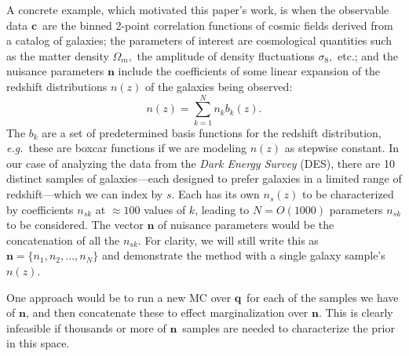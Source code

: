\documentclass[onecolumn,resetfootnote]{aastex7}
\newcommand{\eg}{\textit{e.g.}}
\newcommand{\vecc}{\ensuremath{\mathbf{c}}}
\newcommand{\vecq}{\ensuremath{\mathbf{q}}}
\newcommand{\vecn}{\ensuremath{\mathbf{n}}}
\begin{document}
A concrete example, which motivated this paper's work,
is when the observable data \vecc\ are the binned 2-point correlation functions of
cosmic fields derived from a catalog of galaxies; the parameters of
interest are cosmological quantities such as the  matter density
$\Omega_m,$ the amplitude of density fluctuations $\sigma_8,$
etc.; and the nuisance parameters $\vecn$
include the coefficients of some linear expansion of the redshift distributions $n(z)$ of the galaxies being observed:
\begin{equation}
  n(z) = \sum_{k=1}^{N} n_k b_k(z).
  \label{eq:nzbasis}
\end{equation}
The $b_k$ are a set of predetermined basis functions for the redshift
distribution, \eg\ these are boxcar functions if we are modeling $n(z)$ as
  stepwise constant.  In our case of analyzing the data from the  \textit{Dark Energy Survey} (DES), there are 10 distinct samples of galaxies---each designed to prefer galaxies in a limited range of redshift---which we can index by $s.$ Each has its own $n_s(z)$ to be characterized by coefficients $n_{sk}$ at $\approx100$ values of $k$, leading to $N=O(1000)$ parameters $n_{sk}$ to be considered.  The vector $\vecn$ of nuisance parameters would be the concatenation of all the $n_{sk}.$ For clarity, we will still write this as $\vecn=\{n_1,n_2,\ldots,n_N\}$ and demonstrate the method with a single galaxy sample's $n(z)$.

One approach would be to run a new MC over \vecq\ for each of the samples
we have of \vecn, and then concatenate these to effect marginalization over
\vecn.  This is clearly infeasible if thousands or more of \vecn\ samples are needed to characterize the prior in this space.
\end{document}
